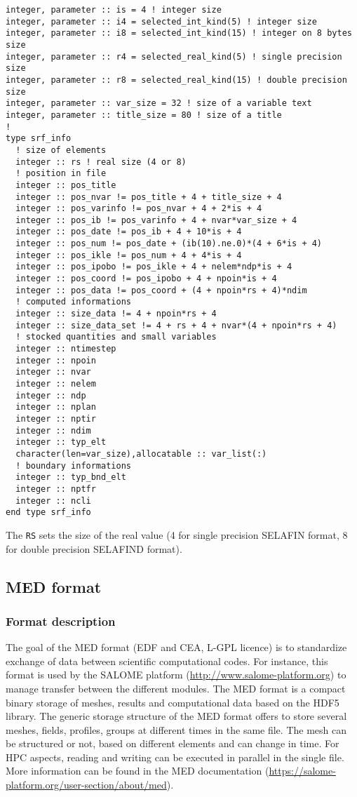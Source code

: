 \begin{lstlisting}
integer, parameter :: is = 4 ! integer size
integer, parameter :: i4 = selected_int_kind(5) ! integer size
integer, parameter :: i8 = selected_int_kind(15) ! integer on 8 bytes size
integer, parameter :: r4 = selected_real_kind(5) ! single precision size
integer, parameter :: r8 = selected_real_kind(15) ! double precision size
integer, parameter :: var_size = 32 ! size of a variable text
integer, parameter :: title_size = 80 ! size of a title
!
type srf_info
  ! size of elements
  integer :: rs ! real size (4 or 8)
  ! position in file
  integer :: pos_title
  integer :: pos_nvar != pos_title + 4 + title_size + 4
  integer :: pos_varinfo != pos_nvar + 4 + 2*is + 4
  integer :: pos_ib != pos_varinfo + 4 + nvar*var_size + 4
  integer :: pos_date != pos_ib + 4 + 10*is + 4
  integer :: pos_num != pos_date + (ib(10).ne.0)*(4 + 6*is + 4)
  integer :: pos_ikle != pos_num + 4 + 4*is + 4
  integer :: pos_ipobo != pos_ikle + 4 + nelem*ndp*is + 4
  integer :: pos_coord != pos_ipobo + 4 + npoin*is + 4
  integer :: pos_data != pos_coord + (4 + npoin*rs + 4)*ndim
  ! computed informations
  integer :: size_data != 4 + npoin*rs + 4
  integer :: size_data_set != 4 + rs + 4 + nvar*(4 + npoin*rs + 4)
  ! stocked quantities and small variables
  integer :: ntimestep
  integer :: npoin
  integer :: nvar
  integer :: nelem
  integer :: ndp
  integer :: nplan
  integer :: nptir
  integer :: ndim
  integer :: typ_elt
  character(len=var_size),allocatable :: var_list(:)
  ! boundary informations
  integer :: typ_bnd_elt
  integer :: nptfr
  integer :: ncli
end type srf_info
\end{lstlisting}
%
The \verb!RS! sets the size of the real value (4 for single precision SELAFIN
format, 8 for double precision SELAFIND format).
%
\subsection{MED format}
%
\subsubsection{Format description}
%
The goal of the MED format (EDF and CEA, L-GPL licence) is to standardize
exchange of data between scientific computational codes. For instance, this
format is used by the SALOME platform (\url{http://www.salome-platform.org})
to manage transfer between the different modules. The MED format is a compact
binary storage of meshes, results and computational data based on the HDF5
library. The generic storage structure of the MED format offers to store
several meshes, fields, profiles, groups at different times in the same file.
The mesh can be structured or not, based on different elements and can change
in time. For HPC aspects, reading and writing can be executed in parallel in
the single file. More information can be found in the MED documentation
(\url{https://salome-platform.org/user-section/about/med}).
%
